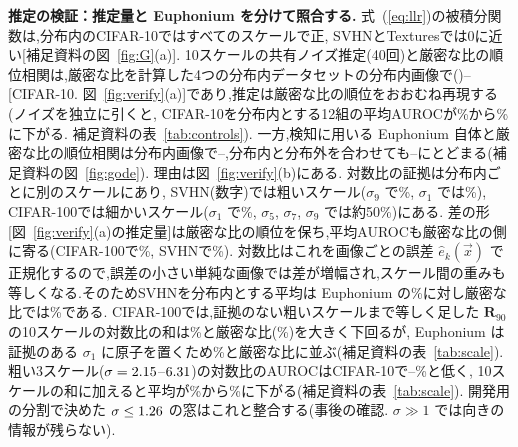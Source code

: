 \documentclass[MIRU,submit,onecolumn]{miru2025j}
\newcommand{\Rot}[1]{\mathbf{R}_{#1}}
\renewcommand{\eqref}[1]{(\ref{#1})}   %
\begin{document}
\textbf{推定の検証：推定量と Euphonium を分けて照合する.}
式~\eqref{eq:llr}の被積分関数は,分布内のCIFAR-10ではすべてのスケールで正, SVHNとTexturesでは0に近い[補足資料の図~\ref{fig:G}(a)]. %
10スケールの共有ノイズ推定(40回)と厳密な比の順位相関は,厳密な比を計算した4つの分布内データセットの分布内画像で\rhoEstMin{}(\rhoEstMinName)--\rhoEstMax{}[CIFAR-10. 図~\ref{fig:verify}(a)]であり,推定は厳密な比の順位をおおむね再現する(ノイズを独立に引くと, CIFAR-10を分布内とする12組の平均AUROCが\estMain\%から\estIndep\%に下がる. 補足資料の表~\ref{tab:controls}).%
一方,検知に用いる Euphonium 自体と厳密な比の順位相関は分布内画像で\rhoGMin{}--\rhoGMax{},分布内と分布外を合わせても\rhoPoolGMin{}--\rhoPoolGMax{}にとどまる(補足資料の図~\ref{fig:gode}).%
理由は図~\ref{fig:verify}(b)にある. %
対数比の証拠は分布内ごとに別のスケールにあり, SVHN(数字)では粗いスケール($\sigma_9$ で\psCoarseSVHN\%, $\sigma_1$ では\psFineSVHN\%), CIFAR-100では細かいスケール($\sigma_1$ で\psFineCh\%, $\sigma_5$, $\sigma_7$, $\sigma_9$ では約50\%)にある.%
差の形[図~\ref{fig:verify}(a)の推定量]は厳密な比の順位を保ち,平均AUROCも厳密な比の側に寄る(CIFAR-100で\dTenCh\%, SVHNで\dTenSVHN\%).%
対数比はこれを画像ごとの誤差 $\hat e_k(\vec{x})$ で正規化するので,誤差の小さい単純な画像では差が増幅され,スケール間の重みも等しくなる.そのためSVHNを分布内とする平均は Euphonium の\oGSVHN\%に対し厳密な比では\oODESVHN\%である. CIFAR-100では,証拠のない粗いスケールまで等しく足した $\Rot{90}$ の10スケールの対数比の和は\gTenCh\%と厳密な比(\oODECh\%)を大きく下回るが, Euphonium は証拠のある $\sigma_1$ に原子を置くため\oGCh\%と厳密な比に並ぶ(補足資料の表~\ref{tab:scale}). %
粗い3スケール($\sigma=2.15$--$6.31$)の対数比のAUROCはCIFAR-10で\psDropACten{}--\psDropCCten\%と低く, 10スケールの和に加えると平均が\gTenCten\%から\gThirteenCten\%に下がる(補足資料の表~\ref{tab:scale}). 開発用の分割で決めた $\sigma\le1.26$ の窓はこれと整合する(事後の確認. $\sigma\gg1$ では向きの情報が残らない).
\end{document}

